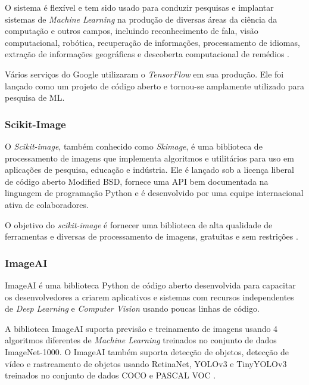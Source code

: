 O sistema é flexível e tem sido usado para conduzir pesquisas e implantar sistemas de \textit{Machine Learning} na produção de diversas áreas da ciência da computação e outros campos, incluindo reconhecimento de fala, visão computacional, robótica, recuperação de informações, processamento de idiomas, extração de informações geográficas e descoberta computacional de remédios \cite{abadi2016tensorflow}.

Vários serviços do Google utilizaram o \textit{TensorFlow} em sua produção. Ele foi lançado como um projeto de código aberto e tornou-se amplamente utilizado para pesquisa de ML.\cite{199317}


\subsubsection{Scikit-Image}

O \textit{Scikit-image}, também conhecido como \textit{Skimage}, é uma biblioteca de processamento de imagens que implementa algoritmos e utilitários para uso em aplicações de pesquisa, educação e indústria. Ele é lançado sob a licença liberal de código aberto Modified BSD, fornece uma API bem documentada na linguagem de programação Python e é desenvolvido por uma equipe internacional ativa de colaboradores.

O objetivo do \textit{scikit-image} é fornecer uma biblioteca de alta qualidade de ferramentas e diversas de processamento de imagens, gratuitas e sem restrições \cite{skimage}.


\subsubsection{ImageAI}

ImageAI é uma biblioteca Python de código aberto desenvolvida para capacitar os desenvolvedores a criarem aplicativos e sistemas com recursos independentes de \textit{Deep Learning} e \textit{Computer Vision} usando poucas linhas de código.

A biblioteca ImageAI suporta previsão e treinamento de imagens usando 4 algoritmos diferentes de \textit{Machine Learning} treinados no conjunto de dados ImageNet-1000. O ImageAI também suporta detecção de objetos, detecção de vídeo e rastreamento de objetos usando RetinaNet, YOLOv3 e TinyYOLOv3 treinados no conjunto de dados COCO e PASCAL VOC \cite{ImageAI}.

